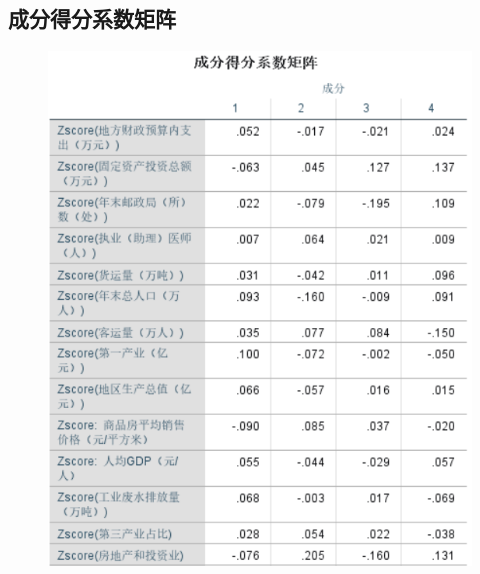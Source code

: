 \documentclass{whutmod}
\begin{document}
\subsection{成分得分系数矩阵}
\begin{figure}[H]
	\centering
	\includegraphics[width=\textwidth]{figures/5.png}
	
\end{figure}  
\end{document}
